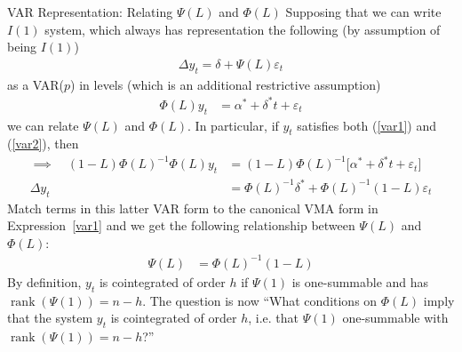 \documentclass[aspectratio=169, handout]{beamer}
\newcommand{\rank}{\operatorname{rank}}
\begin{document}
{\scriptsize
\begin{frame}{VAR Representation: Relating $\Psi(L)$ and $\Phi(L)$}
Supposing that we can write $I(1)$ system, which always has
representation the following (by assumption of being $I(1)$)
\begin{align}
  \Delta y_t = \delta + \Psi(L)\varepsilon_t
  \label{var1}
\end{align}
as a VAR($p$) in levels (which is an additional restrictive assumption)
\begin{align}
  \Phi(L)y_t
  &=
  \alpha^* + \delta^* t
  + \varepsilon_t
  \label{var2}
\end{align}
we can relate $\Psi(L)$ and $\Phi(L)$.
In particular, if $y_t$ satisfies both (\ref{var1}) and (\ref{var2}),
then
\begin{align*}
  \implies\quad
  (1-L)\Phi(L)^{-1}\Phi(L)y_t
  &=
  (1-L)\Phi(L)^{-1}
  \big[
  \alpha^* + \delta^* t
  + \varepsilon_t
  \big]
  \\
  \Delta y_t
  &=
  \Phi(L)^{-1}\delta^*
  + \Phi(L)^{-1}(1-L)\varepsilon_t
\end{align*}
Match terms in this latter VAR form to the canonical VMA form in
Expression~\ref{var1} and we get the following relationship between
$\Psi(L)$ and $\Phi(L)$:
\begin{align*}
  \Psi(L)
  &=
  \Phi(L)^{-1}(1-L)
\end{align*}
By definition, $y_t$ is cointegrated of order $h$ if $\Psi(1)$ is
one-summable and has $\rank(\Psi(1))=n-h$.
The question is now ``What conditions \alert{on $\Phi(L)$}
imply that the system $y_t$ is cointegrated of order $h$, i.e. that
$\Psi(1)$ one-summable with $\rank(\Psi(1))=n-h$?''
\end{frame}
}
\end{document}

